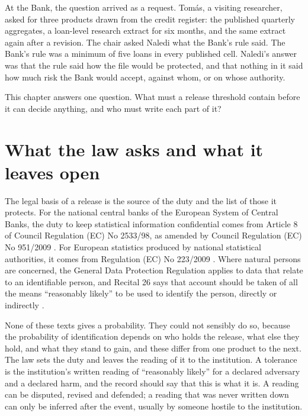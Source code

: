 At the Bank, the question arrived as a request. Tom\'as, a visiting researcher,
asked for three products drawn from the credit register: the published quarterly
aggregates, a loan-level research extract for six months, and the same extract
again after a revision. The chair asked Naledi what the Bank's rule said. The
Bank's rule was a minimum of five loans in every published cell. Naledi's answer was
that the rule said how the file would be protected, and that nothing in it said how
much risk the Bank would accept, against whom, or on whose authority.

This chapter answers one question. What must a release threshold contain before it
can decide anything, and who must write each part of it?

\section{What the law asks and what it leaves open}\label{c07:sec-law}

The legal basis of a release is the source of the duty and the list of those it
protects. For the national central banks of the European System of Central Banks,
the duty to keep statistical information confidential comes from Article 8 of
Council Regulation (EC) No 2533/98, as amended by Council Regulation (EC) No
951/2009 \citep{ec2533,ec951}. For European statistics produced by national
statistical authorities, it comes from Regulation (EC) No 223/2009 \citep{ec223}.
Where natural persons are concerned, the General Data Protection Regulation applies
to data that relate to an identifiable person, and Recital 26 says that account
should be taken of all the means ``reasonably likely'' to be used to identify the
person, directly or indirectly \citep{gdpr2016}.

None of these texts gives a probability. They could not sensibly do so, because
the probability of identification depends on who holds the release, what else they
hold, and what they stand to gain, and these differ from one product to the next.
The law sets the duty and leaves the reading of it to the institution. A tolerance
is the institution's written reading of ``reasonably likely'' for a declared
adversary and a declared harm, and the record should say that this is what it is.
A reading can be disputed, revised and defended; a reading that was never written
down can only be inferred after the event, usually by someone hostile to the
institution.

